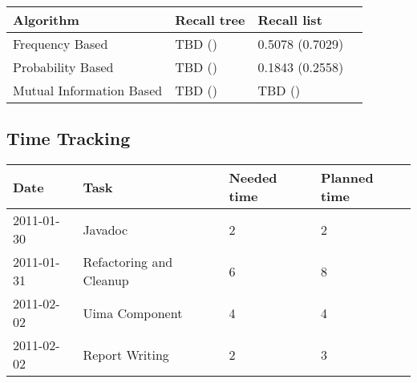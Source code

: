 \documentclass[11pt, accentcolor=tud9b, nochapname]{tudexercise}
\begin{document}
\vspace{10pt}
\begin{tabular}{l | l | l | l}
  \hline
  \textbf{Algorithm} & \textbf{Recall tree} & \textbf{Recall list} \\ \hline
  Frequency Based & TBD () & 0.5078 (0.7029) \\ \hline
  Probability Based & TBD () & 0.1843 (0.2558) \\ \hline
  Mutual Information Based & TBD () & TBD () \\ \hline
\end{tabular}
\vspace{10pt}


\subsection{Time Tracking}

\begin{tabular}{l | l | l | l}
  \hline
  \textbf{Date} & \textbf{Task} & \textbf{Needed time} & \textbf{Planned time} \\ \hline
  2011-01-30 & Javadoc & 2 & 2 \\ \hline
  2011-01-31 & Refactoring and Cleanup & 6 & 8 \\ \hline
  2011-02-02 & Uima Component & 4 & 4 \\ \hline
  2011-02-02 & Report Writing & 2 & 3 \\ \hline
\end{tabular}
\end{document}
